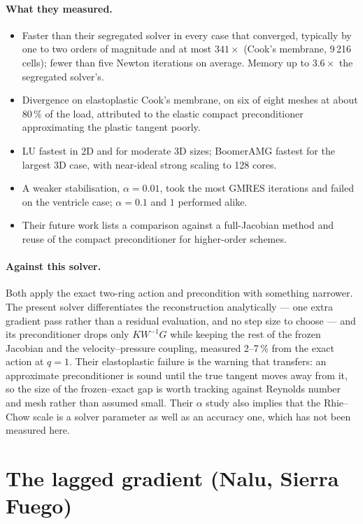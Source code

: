 \documentclass[11pt,a4paper]{article}
\begin{document}
\paragraph{What they measured.}
\begin{itemize}[leftmargin=*, itemsep=2pt]
\item Faster than their segregated solver in every case that converged, typically by one to two
orders of magnitude and at most $341\times$ (Cook's membrane, 9\,216 cells); fewer than five Newton
iterations on average. Memory up to $3.6\times$ the segregated solver's.
\item Divergence on elastoplastic Cook's membrane, on six of eight meshes at about 80\,\% of the
load, attributed to the elastic compact preconditioner approximating the plastic tangent poorly.
\item LU fastest in 2D and for moderate 3D sizes; BoomerAMG fastest for the largest 3D case, with
near-ideal strong scaling to 128 cores.
\item A weaker stabilisation, $\alpha=0.01$, took the most GMRES iterations and failed on the
ventricle case; $\alpha=0.1$ and $1$ performed alike.
\item Their future work lists a comparison against a full-Jacobian method and reuse of the compact
preconditioner for higher-order schemes.
\end{itemize}

\paragraph{Against this solver.} Both apply the exact two-ring action and precondition with
something narrower. The present solver differentiates the reconstruction analytically --- one extra
gradient pass rather than a residual evaluation, and no step size to choose --- and its
preconditioner drops only $K W^{-1} G$ while keeping the rest of the frozen Jacobian and the
velocity--pressure coupling, measured 2--7\,\% from the exact action at $q=1$. Their elastoplastic
failure is the warning that transfers: an approximate preconditioner is sound until the true
tangent moves away from it, so the size of the frozen--exact gap is worth tracking against Reynolds
number and mesh rather than assumed small. Their $\alpha$ study also implies that the Rhie--Chow
scale is a solver parameter as well as an accuracy one, which has not been measured here.

\FloatBarrier
\section{The lagged gradient (Nalu, Sierra Fuego)}
\label{sec:lagged}
\end{document}
